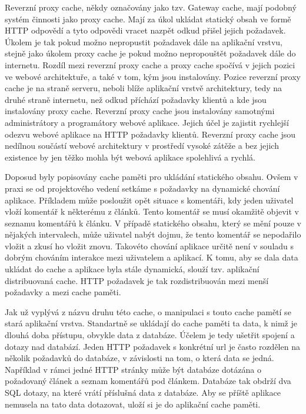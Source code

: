 \documentclass[12pt]{article}
\begin{document}
\obrazek
{}

\label{sec:reverse-proxy}
Reverzní proxy cache, někdy označovány jako tzv. Gateway cache, mají podobný systém činnosti jako proxy cache. Mají za úkol ukládat statický obsah ve formě HTTP odpovědí a tyto odpovědi vracet nazpět odkud přišel jejich požadavek. Úkolem je tak pokud možno nepropustit požadavek dále na aplikační vrstvu, stejně jako úkolem proxy cache je pokud možno nepropouštět požadavek dále do internetu. Rozdíl mezi reverzní proxy cache a proxy cache spočívá v jejich pozici ve webové architektuře, a také v tom, kým jsou instalovány. Pozice reverzní proxy cache je na straně serveru, neboli blíže aplikační vrstvě architektury, tedy na druhé straně internetu, než odkud příchází požadavky klientů a kde jsou instalovány proxy cache. Reverzní proxy cache jsou instalovány samotnými administrátory a programátory webové aplikace. Jejich účel je zajistit rychlejší odezvu webové aplikace na HTTP požadavky klientů. Reverzní proxy cache jsou nedílnou součástí webové architektury v prostředí vysoké zátěže a bez jejich existence by jen těžko mohla být webová aplikace spolehlivá a rychlá.\cite{proxy-cache}

\obrazek
{}

Doposud byly popisovány cache paměti pro ukládání statického obsahu. Ovšem v praxi se od projektového vedení setkáme s požadavky na dynamické chování aplikace. Příkladem může posloužit opět situace s komentáři, kdy jeden uživatel vloží komentář k některému z článků. Tento komentář se musí okamžitě objevit v seznamu komentářů k článku. V případě statického obsahu, který se mění pouze v nějakých intervalech, může uživatel nabýt dojmu, že tento komentář se nepodařilo vložit a zkusí ho vložit znovu. Takovéto chování aplikace určitě není v souladu s dobrým chováním interakce mezi uživatelem a aplikací. K tomu, aby se dala data ukládat do cache a aplikace byla stále dynamická, slouží tzv. aplikační distribuovaná cache. HTTP požadavek je tak rozdistribuován mezi menší požadavky a mezi cache paměti.

Jak už vyplývá z názvu druhu této cache, o manipulaci s touto cache pamětí se stará aplikační vrstva. Standartně se ukládají do cache paměti ta data, k nimž je dlouhá doba přístupu, obvykle data z databáze. Účelem je tedy ušetřit spojení a dotazy nad databází. Jeden HTTP požadavek s konkrétní url je často rozdělen na několik požadavků do databáze, v závislosti na tom, o která data se jedná. Například v rámci jedné HTTP stránky může být databáze dotázána o požadovaný článek a seznam komentářů pod článkem. Databáze tak obdrží dva SQL dotazy, na které vrátí příslušná data z databáze. Aby se příště aplikace nemusela na tato data dotazovat, uloží si je do aplikační cache paměti.
\end{document}
